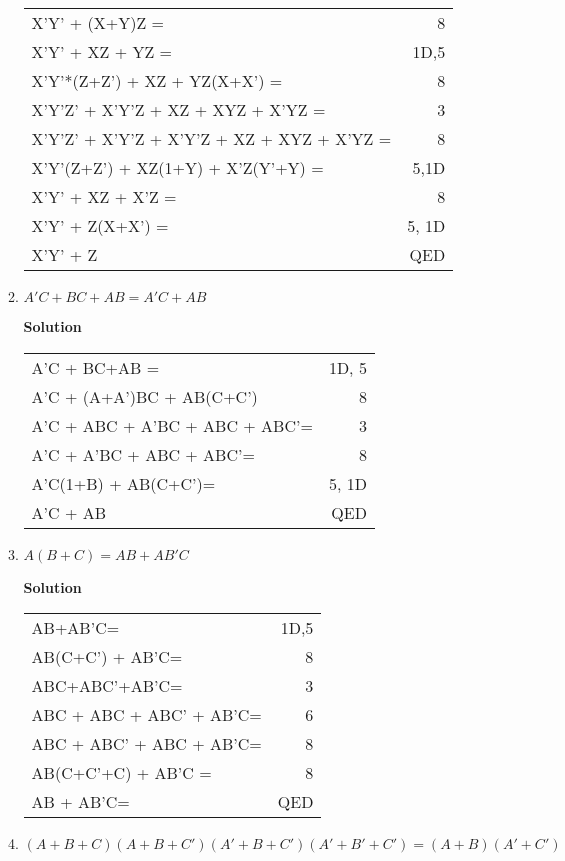 \begin{enumerate}
\begin{enumerate}
\begin{onlysolution}
\begin{tabular}{lr}
X'Y' + (X+Y)Z = 				& 8\\
X'Y' + XZ + YZ = 				& 1D,5 \\
X'Y'*(Z+Z') + XZ + YZ(X+X') =  			& 8 \\
X'Y'Z' + X'Y'Z + XZ + XYZ + X'YZ =  		& 3 \\
X'Y'Z' + X'Y'Z + X'Y'Z + XZ + XYZ + X'YZ =  	& 8 \\
X'Y'(Z+Z') + XZ(1+Y) + X'Z(Y'+Y) =  		& 5,1D \\
X'Y' + XZ + X'Z  =  				& 8 \\
X'Y' + Z(X+X') =  				& 5, 1D\\
X'Y' + Z 					& QED \\
\end{tabular} \end{onlysolution}

	\item $A'C+BC+AB = A'C+AB$

\begin{onlysolution}  \textbf{Solution} \itshape

\begin{tabular}{lr}
A'C + BC+AB =  					& 1D, 5 \\
A'C + (A+A')BC + AB(C+C') 			& 8  \\
A'C + ABC + A'BC + ABC + ABC'= 			& 3\\
A'C + A'BC + ABC + ABC'= 			& 8\\
A'C(1+B) + AB(C+C')= 				& 5, 1D\\
A'C + AB 					& QED \\
\end{tabular} \end{onlysolution}
	\item $A(B+C)=AB+AB'C$

\begin{onlysolution}  \textbf{Solution} \itshape

\begin{tabular}{lr}
AB+AB'C= 					& 1D,5\\
AB(C+C') + AB'C= 				& 8 \\
ABC+ABC'+AB'C= 					& 3 \\
ABC + ABC + ABC' + AB'C= 			& 6\\
ABC + ABC' + ABC + AB'C= 			& 8\\
AB(C+C'+C) + AB'C = 				& 8\\	
AB + AB'C= 					& QED\\
\end{tabular}	\end{onlysolution}
	\item $(A+B+C)(A+B+C')(A'+B+C')(A'+B'+C') = (A+B)(A'+C')$


\end{enumerate}
\end{enumerate}
